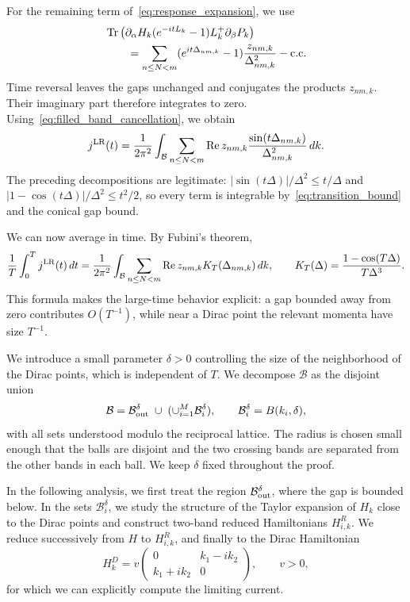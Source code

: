 \documentclass[a4paper,11pt]{article}
\theoremstyle{plain}
\theoremstyle{remark}
\begin{document}
For the remaining term of~\eqref{eq:response_expansion}, we use
\begin{align*}
&\Tr\left(\partial_\alpha H_k(e^{-itL_k}-1)L_k^+\partial_\beta P_k\right)\\
&\qquad=\sum_{n\le N<m}(e^{it\Delta_{nm,k}}-1)
\frac{z_{nm,k}}{\Delta_{nm,k}^2}-{\rm c.c.}
\end{align*}
Time reversal leaves the gaps unchanged and conjugates the products
$z_{nm,k}$. Their imaginary part therefore integrates to zero.
Using~\eqref{eq:filled_band_cancellation}, we obtain
\begin{equation}\label{eq:linear_response_current}
j^{\rm LR}(t)=\frac1{2\pi^2}\int_{\mathcal B}
\sum_{n\le N<m}\operatorname{Re}z_{nm,k}
\frac{\sin(t\Delta_{nm,k})}{\Delta_{nm,k}^2}\,dk.
\end{equation}
The preceding decompositions are legitimate:
$|\sin(t\Delta)|/\Delta^2\le t/\Delta$ and
$|1-\cos(t\Delta)|/\Delta^2\le t^2/2$, so every term is integrable
by~\eqref{eq:transition_bound} and the conical gap bound.

We can now average in time. By Fubini's theorem,
\begin{equation}\label{eq:averaged_response}
\frac1T\int_0^Tj^{\rm LR}(t)\,dt
=\frac1{2\pi^2}\int_{\mathcal B}
\sum_{n\le N<m}\operatorname{Re}z_{nm,k}K_T(\Delta_{nm,k})\,dk,
\qquad K_T(\Delta)=\frac{1-\cos(T\Delta)}{T\Delta^3}.
\end{equation}
This formula makes the large-time behavior explicit: a gap bounded
away from zero contributes $O(T^{-1})$, while near a Dirac point the
relevant momenta have size $T^{-1}$.

\medskip

We introduce a small parameter $\delta>0$ controlling the size of the
neighborhood of the Dirac points, which is independent of $T$.
We decompose $\mathcal B$ as the disjoint union
\[
\mathcal B=\mathcal B_{\rm out}^{\delta}
\;\cup\;(\cup_{i=1}^M\mathcal B_i^\delta),
\qquad \mathcal B_i^\delta=B(k_i,\delta),
\]
with all sets understood modulo the reciprocal lattice. The radius is
chosen small enough that the balls are disjoint and the two crossing
bands are separated from the other bands in each ball.
We keep $\delta$ fixed throughout the proof.

In the following analysis, we first treat the region
$\mathcal B_{\rm out}^{\delta}$, where the gap is bounded below.
In the sets $\mathcal B_i^\delta$, we study the structure of the Taylor
expansion of $H_k$ close to the Dirac points and construct two-band
reduced Hamiltonians $H_{i,k}^R$. We reduce successively from $H$ to
$H_{i,k}^R$, and finally to the Dirac Hamiltonian
\[
H_k^D=v\begin{pmatrix}0&k_1-ik_2\\k_1+ik_2&0\end{pmatrix},\qquad v>0,
\]
for which we can explicitly compute the limiting current.
\end{document}
